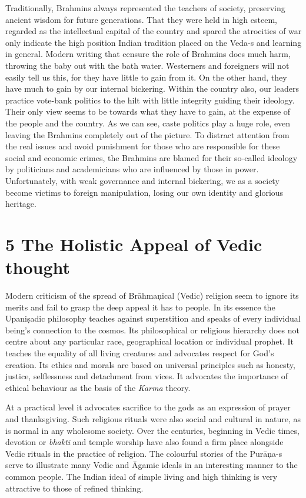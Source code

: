 Traditionally, Brahmins always represented the teachers of society, preserving ancient wisdom for future generations. That they were held in high esteem, regarded as the intellectual capital of the country and spared the atrocities of war only indicate the high position Indian tradition placed on the Veda-s and learning in general. Modern writing that censure the role of Brahmins does much harm, throwing the baby out with the bath water. Westerners and foreigners will not easily tell us this, for they have little to gain from it. On the other hand, they have much to gain by our internal bickering. Within the country also, our leaders practice vote-bank politics to the hilt with little integrity guiding their ideology. Their only view seems to be towards what they have to gain, at the expense of the people and the country. As we can see, caste politics play a huge role, even leaving the Brahmins completely out of the picture. To distract attention from the real issues and avoid punishment for those who are responsible for these social and economic crimes, the Brahmins are blamed for their so-called ideology by politicians and academicians who are influenced by those in power. Unfortunately, with weak governance and internal bickering, we as a society become victims to foreign manipulation, losing our own identity and glorious heritage.


\section*{5 The Holistic Appeal of Vedic thought}

Modern criticism of the spread of Brāhmaņical (Vedic) religion seem to ignore its merits and fail to grasp the deep appeal it has to people. In its essence the Upaniṣadic philosophy teaches against superstition and speaks of every individual being’s connection to the cosmos. Its philosophical or religious hierarchy does not centre about any particular race, geographical location or individual prophet. It teaches the equality of all living creatures and advocates respect for God’s creation. Its ethics and morals are based on universal principles such as honesty, justice, selflessness and detachment from vices. It advocates the importance of ethical behaviour as the basis of the \textit{Karma} theory.

At a practical level it advocates sacrifice to the gods as an expression of prayer and thanksgiving. Such religious rituals were also social and cultural in nature, as is normal in any wholesome society. Over the centuries, beginning in Vedic times, devotion or \textit{bhakti} and temple worship have also found a firm place alongside Vedic rituals in the practice of religion. The colourful stories of the Purāņa-s serve to illustrate many Vedic and Āgamic ideals in an interesting manner to the common people. The Indian ideal of simple living and high thinking is very attractive to those of refined thinking. 

